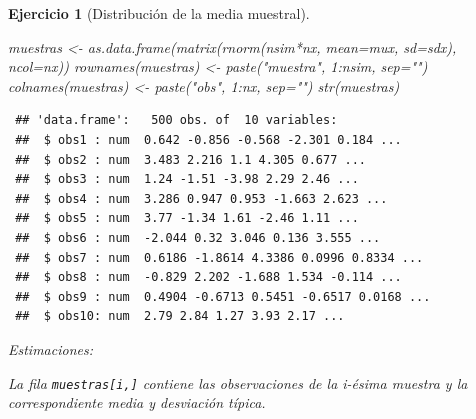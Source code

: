 \documentclass[
  10pt,
]{book}
\newenvironment{Shaded}{\begin{snugshade}}{\end{snugshade}}
\newcommand{\AttributeTok}[1]{\textcolor[rgb]{0.77,0.63,0.00}{#1}}
\newcommand{\DecValTok}[1]{\textcolor[rgb]{0.00,0.00,0.81}{#1}}
\newcommand{\FunctionTok}[1]{\textcolor[rgb]{0.00,0.00,0.00}{#1}}
\newcommand{\NormalTok}[1]{#1}
\newcommand{\OtherTok}[1]{\textcolor[rgb]{0.56,0.35,0.01}{#1}}
\newcommand{\SpecialCharTok}[1]{\textcolor[rgb]{0.00,0.00,0.00}{#1}}
\newcommand{\StringTok}[1]{\textcolor[rgb]{0.31,0.60,0.02}{#1}}
\theoremstyle{break}
\newtheorem{exercise}{Ejercicio}[chapter]
\theoremstyle{nonumberplain}
\begin{document}
\begin{exercise}[Distribución de la media muestral]
\begin{enumerate}
\begin{Shaded}
\begin{Highlighting}[]
\NormalTok{muestras }\OtherTok{\textless{}{-}} \FunctionTok{as.data.frame}\NormalTok{(}\FunctionTok{matrix}\NormalTok{(}\FunctionTok{rnorm}\NormalTok{(nsim}\SpecialCharTok{*}\NormalTok{nx, }\AttributeTok{mean=}\NormalTok{mux, }\AttributeTok{sd=}\NormalTok{sdx), }\AttributeTok{ncol=}\NormalTok{nx))}
\FunctionTok{rownames}\NormalTok{(muestras) }\OtherTok{\textless{}{-}} \FunctionTok{paste}\NormalTok{(}\StringTok{"muestra"}\NormalTok{, }\DecValTok{1}\SpecialCharTok{:}\NormalTok{nsim, }\AttributeTok{sep=}\StringTok{""}\NormalTok{)}
\FunctionTok{colnames}\NormalTok{(muestras) }\OtherTok{\textless{}{-}} \FunctionTok{paste}\NormalTok{(}\StringTok{"obs"}\NormalTok{, }\DecValTok{1}\SpecialCharTok{:}\NormalTok{nx, }\AttributeTok{sep=}\StringTok{""}\NormalTok{)}
\FunctionTok{str}\NormalTok{(muestras)}
\end{Highlighting}
\end{Shaded}

\begin{verbatim}
 ## 'data.frame':   500 obs. of  10 variables:
 ##  $ obs1 : num  0.642 -0.856 -0.568 -2.301 0.184 ...
 ##  $ obs2 : num  3.483 2.216 1.1 4.305 0.677 ...
 ##  $ obs3 : num  1.24 -1.51 -3.98 2.29 2.46 ...
 ##  $ obs4 : num  3.286 0.947 0.953 -1.663 2.623 ...
 ##  $ obs5 : num  3.77 -1.34 1.61 -2.46 1.11 ...
 ##  $ obs6 : num  -2.044 0.32 3.046 0.136 3.555 ...
 ##  $ obs7 : num  0.6186 -1.8614 4.3386 0.0996 0.8334 ...
 ##  $ obs8 : num  -0.829 2.202 -1.688 1.534 -0.114 ...
 ##  $ obs9 : num  0.4904 -0.6713 0.5451 -0.6517 0.0168 ...
 ##  $ obs10: num  2.79 2.84 1.27 3.93 2.17 ...
\end{verbatim}

  Estimaciones:

\begin{Shaded}
\end{Shaded}

  La fila \texttt{muestras{[}i,{]}} contiene las observaciones de la i-ésima muestra y
  la correspondiente media y desviación típica.


\end{enumerate}
\end{exercise}
\end{document}

